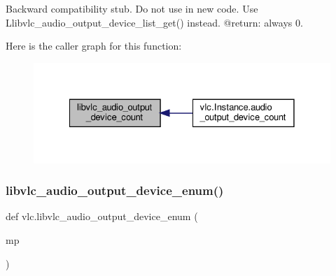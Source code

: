 \begin{DoxyVerb}Backward compatibility stub. Do not use in new code.
\deprecated Use L{libvlc_audio_output_device_list_get}() instead.
@return: always 0.
\end{DoxyVerb}
 Here is the caller graph for this function\+:
\nopagebreak
\begin{figure}[H]
\begin{center}
\leavevmode
\includegraphics[width=328pt]{namespacevlc_ab26cd1fc475f71b8faa4e86f9c95ce21_icgraph}
\end{center}
\end{figure}
\mbox{\label{namespacevlc_ad0eaa466313964c4c8f8fca0cdb4dc03}} 
\subsubsection{\texorpdfstring{libvlc\+\_\+audio\+\_\+output\+\_\+device\+\_\+enum()}{libvlc\_audio\_output\_device\_enum()}}
{\footnotesize\ttfamily def vlc.\+libvlc\+\_\+audio\+\_\+output\+\_\+device\+\_\+enum (\begin{DoxyParamCaption}\item[{}]{mp }\end{DoxyParamCaption})}

